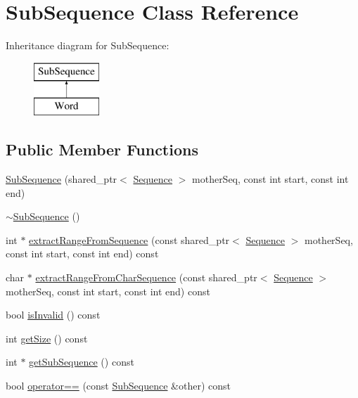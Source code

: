 \hypertarget{classSubSequence}{\section{Sub\-Sequence Class Reference}
\label{classSubSequence}
}
Inheritance diagram for Sub\-Sequence\-:\begin{figure}[H]
\begin{center}
\leavevmode
\includegraphics[height=2.000000cm]{classSubSequence}
\end{center}
\end{figure}
\subsection*{Public Member Functions}
\begin{DoxyCompactItemize}
\item 
\hyperlink{classSubSequence_a655d0a3b46af9b6bf646d37708221668}{Sub\-Sequence} (shared\-\_\-ptr$<$ \hyperlink{classSequence}{Sequence} $>$ mother\-Seq, const int start, const int end)
\item 
\hyperlink{classSubSequence_a8b9442f5f1d03952c5a0491f6dac0f63}{$\sim$\-Sub\-Sequence} ()
\item 
int $\ast$ \hyperlink{classSubSequence_aef9b8911ccfcc690a46734afad4fa2f1}{extract\-Range\-From\-Sequence} (const shared\-\_\-ptr$<$ \hyperlink{classSequence}{Sequence} $>$ mother\-Seq, const int start, const int end) const 
\item 
char $\ast$ \hyperlink{classSubSequence_ad53b4e7176f666ca97841850c7d25a38}{extract\-Range\-From\-Char\-Sequence} (const shared\-\_\-ptr$<$ \hyperlink{classSequence}{Sequence} $>$ mother\-Seq, const int start, const int end) const 
\item 
bool \hyperlink{classSubSequence_a2fab95b3b19abbcce7450b7c5c5ef169}{is\-Invalid} () const 
\item 
int \hyperlink{classSubSequence_a9d468d8c8e06ed55bbbfaead2fc16b4d}{get\-Size} () const 
\item 
int $\ast$ \hyperlink{classSubSequence_a3b17db4593e36945699c662510a6dded}{get\-Sub\-Sequence} () const 
\item 
bool \hyperlink{classSubSequence_a360b7b8f15252a929575c67ac43f6203}{operator==} (const \hyperlink{classSubSequence}{Sub\-Sequence} \&other) const 
\end{DoxyCompactItemize}
